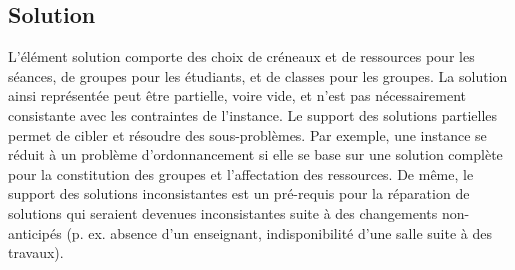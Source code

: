 \subsection{Solution}
L'élément solution comporte des choix de créneaux et de ressources pour les séances, de groupes pour les étudiants, et de classes pour les groupes.
La solution ainsi représentée peut être partielle, voire vide, et n'est pas nécessairement consistante avec les contraintes de l'instance.
Le support des solutions partielles permet de cibler et résoudre des sous-problèmes. %
Par exemple, une instance se réduit à un problème d'ordonnancement si elle se base sur une solution complète pour la constitution des groupes et l'affectation des ressources.
De même, le support des solutions inconsistantes est un pré-requis pour la réparation de solutions qui seraient devenues inconsistantes suite à des changements non-anticipés (p. ex. absence d'un enseignant, indisponibilité d'une salle suite à des travaux).

